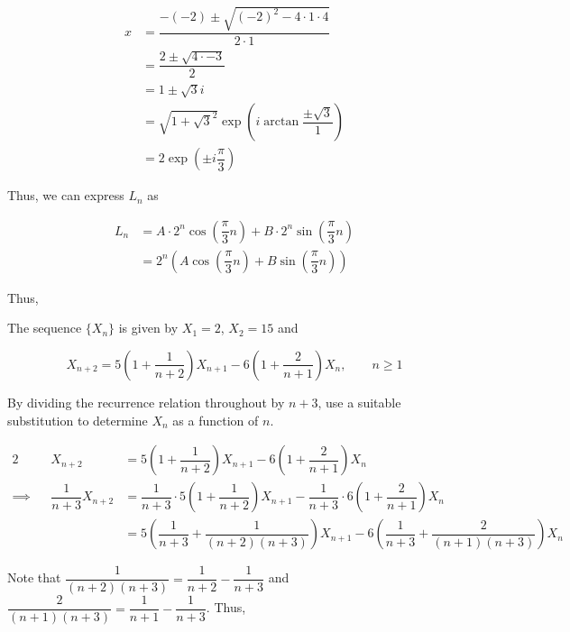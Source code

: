 \documentclass{echw}
\begin{document}
        \begin{align*}
            x &= \dfrac{-(-2) \pm \sqrt{(-2)^2 - 4\cdot1\cdot4}}{2\cdot1}\\
            &= \dfrac{2 \pm \sqrt{4 \cdot -3}}{2}\\
            &= 1 \pm \sqrt{3}i\\
            &= \sqrt{1 + \sqrt{3}^2} \exp{\left(i \arctan{\dfrac{\pm{\sqrt3}}1}\right)}\\
            &= 2 \exp \left(\pm i \dfrac{\pi}3\right)
        \end{align*}

        Thus, we can express $L_n$ as

        \begin{align*}
            L_n &= A \cdot 2^n \cos \left(\dfrac{\pi}3 n\right) + B \cdot 2^n \sin \left(\dfrac{\pi}3 n\right)\\
            &= 2^n \left(A \cos \left(\dfrac{\pi}3 n\right) + B \sin \left(\dfrac{\pi}3 n\right)\right)
        \end{align*}

        Thus,

    \problem{}
        The sequence $\{X_n\}$ is given by $X_1 = 2$, $X_2 = 15$ and

        \begin{equation*}
            X_{n+2} = 5\left(1 + \dfrac1{n+2}\right)X_{n+1} - 6\left(1 + \dfrac2{n+1}\right)X_n, \qquad n \geq 1
        \end{equation*}

        \noindent By dividing the recurrence relation throughout by $n+3$, use a suitable substitution to determine $X_n$ as a function of $n$.

    \solution
        \begin{alignat*}{2}
            &&X_{n+2} &= 5\left(1 + \dfrac1{n+2}\right)X_{n+1} - 6\left(1 + \dfrac2{n+1}\right)X_n\\
            \implies&&\dfrac1{n+3}X_{n+2} &= \dfrac1{n+3} \cdot 5\left(1 + \dfrac1{n+2}\right)X_{n+1} - \dfrac1{n+3} \cdot 6\left(1 + \dfrac2{n+1}\right)X_n\\
            && &= 5\left(\dfrac1{n+3} + \dfrac1{(n+2)(n+3)}\right)X_{n+1} - 6\left(\dfrac1{n+3} + \dfrac2{(n+1)(n+3)}\right)X_n
        \end{alignat*}

        Note that $\dfrac1{(n+2)(n+3)} = \dfrac1{n+2} - \dfrac1{n+3}$ and $\dfrac{2}{(n+1)(n+3)} = \dfrac1{n+1} - \dfrac1{n+3}$. Thus,
\end{document}

